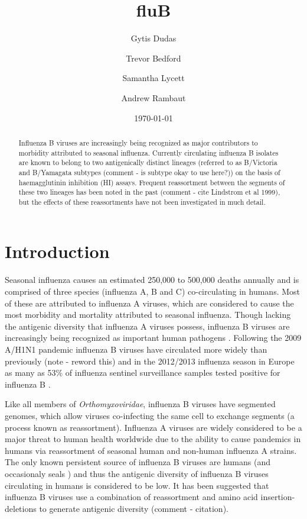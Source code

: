 \documentclass[11pt,oneside,letterpaper]{article}
\title{\vspace{1.0cm} \LARGE \bf fluB}
\author[1]{Gytis Dudas}
\author[1]{Trevor Bedford}
\author[1]{Samantha Lycett}
\author[1,2]{Andrew Rambaut}
\affil[1]{Institute of Evolutionary Biology, University of Edinburgh, Edinburgh, UK}
\affil[2]{Fogarty International Center, National Institutes of Health, Bethesda, MD, USA.}
\date{\today}
\begin{document}
\maketitle

\begin{abstract}

Influenza B viruses are increasingly being recognized as major contributors to morbidity attributed to seasonal influenza. 
Currently circulating influenza B isolates are known to belong to two antigenically distinct lineages (referred to as B/Victoria and B/Yamagata subtypes (comment - is subtype okay to use here?)) on the basis of haemagglutinin inhibition (HI) assays. 
Frequent reassortment between the segments of these two lineages has been noted in the past (comment - cite Lindstrom et al 1999), but the effects of these reassortments have not been investigated in much detail.

\end{abstract}

\pagebreak


\section*{Introduction}
Seasonal influenza causes an estimated 250,000 to 500,000 deaths annually and is comprised of three species (influenza A, B and C) co-circulating in humans.
Most of these are attributed to influenza A viruses, which are considered to cause the most morbidity and mortality attributed to seasonal influenza.
Though lacking the antigenic diversity that influenza A viruses possess, influenza B viruses are increasingly being recognized as important human pathogens \cite{paul-glezen2013}.
Following the 2009 A/H1N1 pandemic influenza B viruses have circulated more widely than previously (note - reword this) and in the 2012/2013 influenza season in Europe as many as 53\% of influenza sentinel surveillance samples tested positive for influenza B \cite{ECDC1213}. 

Like all members of \textit{Orthomyxoviridae}, influenza B viruses have segmented genomes, which allow viruses co-infecting the same cell to exchange segments (a process known as reassortment). 
Influenza A viruses are widely considered to be a major threat to human health worldwide due to the ability to cause pandemics in humans via reassortment of seasonal human and non-human influenza A strains. 
The only known persistent source of influenza B viruses are humans (and occasionaly seals \cite{osterhaus2000}) and thus the antigenic diversity of influenza B viruses circulating in humans is considered to be low. 
It has been suggested that influenza B viruses use a combination of reassortment and amino acid insertion-deletions to generate antigenic diversity (comment - citation).
\end{document}
